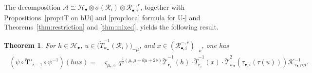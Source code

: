 \documentclass[a4paper,reqno,12pt]{amsart}
\numberwithin{equation}{section}
\newtheorem{theorem}[proposition]{Theorem}
\theoremstyle{definition}
\newtheorem{remark}[proposition]{Remark}
\theoremstyle{plain}
\theoremstyle{definition}
\def\Z{\mathbb Z}
\def\I{\mathbb I}
\def\bI{\I_\bullet}
\def\bIi{\I_{\bullet,i}}
\def\bw{w_\bullet}
\def\br{\mathbf r}
\def\tU{\widetilde{\mathbf U}}
\def \tbiU{\tU_{\bullet,i}}
\def\tTD{\widetilde T}
\def\tT{\widetilde{\mathscr T}}
\def\tTT{\widetilde{\mathbf T}}
\def\cA{\mathcal A}
\def\cR{\mathcal R}
\def\cH{\mathcal H}
\def\cK{\mathcal K}
\def\cG{\mathcal G}
\def\vs{\varsigma}
\def\dm{\diamond}
\newcommand{\tTa}[1]{\tTT'_{#1,-1}}
\newcommand{\wt}{\operatorname{wt}}
\begin{document}

The decomposition $\cA\cong\cH_\bullet\otimes\sigma(\cR_i)\otimes\cR_{\bullet,i}^{-,r}$, together with Propositions~\ref{prop:iT on bUi} and \ref{prop:local formula for U-} and Theorems~\ref{thm:restriction} and \ref{thm:mixed}, yields the following result.
\begin{theorem}\label{thm:full-action}
  For $h\in\cH_\bullet$, $u\in\bigl(\tTD_{\bw}^{-1}(\cR_i)\bigr)_{-\mu}$, and $x\in(\cR_{\bullet,i}^{-,r})_{-\nu}$, one has
\begin{align}
\begin{split}
(\psi\circ\tTa{i}\circ\psi^{-1})(hux)=&\vs_{\mu,\dm}q^{\frac12(\mu,\mu+\theta\mu+2\nu)}\tT_{\br_i}^{-1}(h)\cdot\tTD_{\br_i}^{-1}(x)\cdot\tT_{\bw}^2(\tau_{\bullet,i}(\tau(u)))\cK_{\tau_{\bullet,i}\tau \mu}^{-1}.
\end{split}
\end{align}  
\end{theorem}
\end{document}
